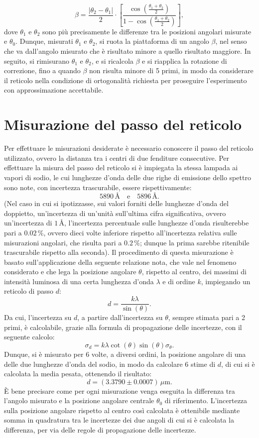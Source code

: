 \documentclass[a4paper,12pt]{article}
\begin{document}
\[
\beta = \frac{|\theta_2 - \theta_1|}{2} \cdot \left[ \frac{\cos\left(\frac{\theta_1 + \theta_2}{2}\right)}{1 - \cos\left(\frac{\theta_1 + \theta_2}{2}\right)} \right],
\]
dove \( \theta_1 \) e \( \theta_2 \) sono più precisamente le differenze tra le posizioni angolari misurate e \( \theta_0 \).
Dunque, misurati \( \theta_1 \) e \( \theta_2 \), si ruota la piattaforma di un angolo \( \beta \), nel senso che va dall’angolo misurato che è risultato minore a quello risultato maggiore. In seguito, si rimisurano \( \theta_1 \) e \( \theta_2 \), e si ricalcola \( \beta \) e si riapplica la rotazione di correzione, fino a quando \( \beta \) non risulta minore di 5 primi, in modo da considerare il reticolo nella condizione di ortogonalità richiesta per proseguire l’esperimento con approssimazione accettabile.

\section{Misurazione del passo del reticolo}
Per effettuare le misurazioni desiderate è necessario conoscere il passo del reticolo utilizzato, ovvero la distanza tra i centri di due fenditure consecutive.
Per effettuare la misura del passo del reticolo si è impiegata la stessa lampada ai vapori di sodio, le cui lunghezze d’onda delle due righe di emissione dello spettro sono note, con incertezza trascurabile, essere rispettivamente:
\[
5890 \, \text{\AA} \quad \text{e} \quad 5896 \, \text{\AA}.
\]
(Nel caso in cui si ipotizzasse, sui valori forniti delle lunghezze d’onda del doppietto, un’incertezza di un’unità sull’ultima cifra significativa, ovvero un’incertezza di \( 1 \, \text{\AA} \), l’incertezza percentuale sulle lunghezze d’onda risulterebbe pari a \( 0.02 \, \% \), ovvero dieci volte inferiore rispetto all’incertezza relativa sulle misurazioni angolari, che risulta pari a \( 0.2 \, \% \); dunque la prima sarebbe ritenibile trascurabile rispetto alla seconda). 
Il procedimento di questa misurazione è basato sull’applicazione della seguente relazione nota, che vale nel fenomeno considerato e che lega la posizione angolare \( \theta \), rispetto al centro, dei massimi di intensità luminosa di una certa lunghezza d’onda \( \lambda \) e di ordine \( k \), impiegando un reticolo di passo \( d \):
\[
d = \frac{k\lambda}{\sin(\theta)}.
\]
Da cui, l’incertezza su \( d \), a partire dall’incertezza su \( \theta \), sempre stimata pari a 2 primi, è calcolabile, grazie alla formula di propagazione delle incertezze, con il seguente calcolo:
\[
\sigma_d = k\lambda \cot(\theta) \sin(\theta) \sigma_\theta.
\]
Dunque, si è misurato per 6 volte, a diversi ordini, la posizione angolare di una delle due lunghezze d’onda del sodio, in modo da calcolare 6 stime di \( d \), di cui si è calcolata la media pesata, ottenendo il risultato:
\[
d = (3.3790 \pm 0.0007) \, \mu\text{m}.
\]
È bene precisare come per ogni misurazione venga eseguita la differenza tra l’angolo misurato e la posizione angolare centrale \( \theta_0 \) di riferimento. L’incertezza sulla posizione angolare rispetto al centro così calcolata è ottenibile mediante somma in quadratura tra le incertezze dei due angoli di cui si è calcolata la differenza, per via delle regole di propagazione delle incertezze.
\end{document}
